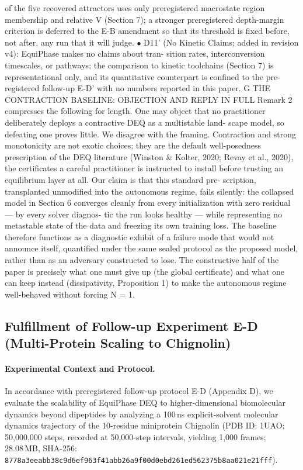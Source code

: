 \documentclass{article}
\begin{document}
of the five recovered attractors uses only preregistered macrostate region membership and
relative V (Section 7); a stronger preregistered depth-margin criterion is deferred to the
E-B amendment so that its threshold is fixed before, not after, any run that it will judge.
$\bullet$  D11' (No Kinetic Claims; added in revision v4): EquiPhase makes no claims about tran-
sition rates, interconversion timescales, or pathways; the comparison to kinetic toolchains
(Section 7) is representational only, and its quantitative counterpart is confined to the pre-
registered follow-up E-D' with no numbers reported in this paper.
G
THE CONTRACTION BASELINE: OBJECTION AND REPLY IN FULL
Remark 2 compresses the following for length.
One may object that no practitioner deliberately deploys a contractive DEQ as a multistable land-
scape model, so defeating one proves little. We disagree with the framing. Contraction and strong
monotonicity are not exotic choices; they are the default well-posedness prescription of the DEQ
literature (Winston \& Kolter, 2020; Revay et al., 2020), the certificates a careful practitioner is
instructed to install before trusting an equilibrium layer at all. Our claim is that this standard pre-
scription, transplanted unmodified into the autonomous regime, fails silently: the collapsed model in
Section 6 converges cleanly from every initialization with zero residual --- by every solver diagnos-
tic the run looks healthy --- while representing no metastable state of the data and freezing its own
training loss. The baseline therefore functions as a diagnostic exhibit of a failure mode that would
not announce itself, quantified under the same sealed protocol as the proposed model, rather than as
an adversary constructed to lose. The constructive half of the paper is precisely what one must give
up (the global certificate) and what one can keep instead (dissipativity, Proposition 1) to make the
autonomous regime well-behaved without forcing N = 1.

\subsection{Fulfillment of Follow-up Experiment E-D (Multi-Protein Scaling to Chignolin)}
\paragraph{Experimental Context and Protocol.}
In accordance with preregistered follow-up protocol E-D (Appendix D), we evaluate the scalability of EquiPhase DEQ to higher-dimensional biomolecular dynamics beyond dipeptides by analyzing a 100\,ns explicit-solvent molecular dynamics trajectory of the 10-residue miniprotein Chignolin (PDB ID: 1UAO; 50,000,000 steps, recorded at 50,000-step intervals, yielding 1,000 frames; $28.08\,\text{MB}$, SHA-256: \texttt{8778a3eeabb38c9d6ef963f41abb26a9f00d0ebd261ed562375b8aa021e21fff}).
\end{document}
